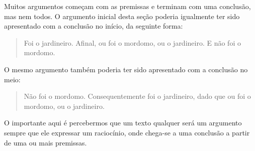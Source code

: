 Muitos argumentos começam com as premissas e terminam com uma conclusão, mas nem todos.
O argumento inicial desta seção poderia igualmente ter sido apresentado com a conclusão no início, da seguinte forma:
	\begin{quote}
		Foi o jardineiro. Afinal, ou foi o mordomo, ou o jardineiro. E não foi o mordomo.
	\end{quote}
O mesmo argumento também poderia ter sido apresentado com a conclusão no meio:
	\begin{quote}
		Não foi o mordomo. Consequentemente foi o jardineiro, dado que ou foi o mordomo, ou o jardineiro.
	\end{quote}
O importante aqui é percebermos que um texto qualquer será um argumento sempre que ele expressar um raciocínio, onde chega-se a uma conclusão a partir de uma ou mais premissas. 

